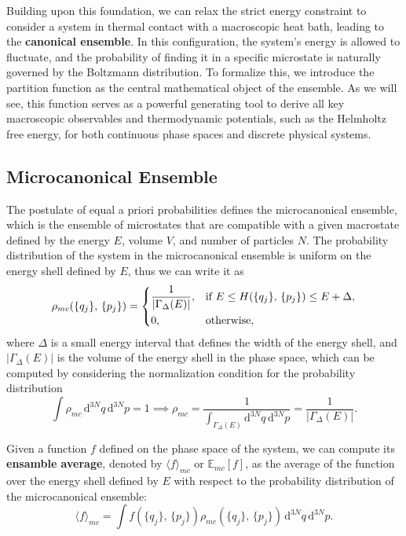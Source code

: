 Building upon this foundation, we can relax the strict energy constraint to consider a system in thermal contact with a macroscopic heat bath, leading to the \textbf{canonical ensemble}. In this configuration, the system's energy is allowed to fluctuate, and the probability of finding it in a specific microstate is naturally governed by the Boltzmann distribution. To formalize this, we introduce the partition function as the central mathematical object of the ensemble. As we will see, this function serves as a powerful generating tool to derive all key macroscopic observables and thermodynamic potentials, such as the Helmholtz free energy, for both continuous phase spaces and discrete physical systems.

\subsection{Microcanonical Ensemble}

The postulate of equal a priori probabilities defines the microcanonical ensemble, which is the ensemble of microstates that are compatible with a given macrostate defined by the energy \(E\), volume \(V\), and number of particles \(N\). The probability distribution of the system in the microcanonical ensemble is uniform on the energy shell defined by \(E\), thus we can write it as
\begin{equation}
    \rho_{mc}(\{q_j\},\,\{p_j\}) = \begin{dcases}
        \frac{1}{|\Gamma_{\Delta}(E)|}, & \text{if } E \leq H(\{q_j\},\,\{p_j\}) \leq E + \Delta, \\
        0,                              & \text{otherwise},
    \end{dcases}
    \label{eq:microcanonical_distribution}
\end{equation}
where \(\Delta\) is a small energy interval that defines the width of the energy shell, and \(|\Gamma_{\Delta}(E)|\) is the volume of the energy shell in the phase space, which can be computed by considering the normalization condition for the probability distribution
\[
    \int \rho_{mc} \, \mathrm{d}^{3N}q \, \mathrm{d}^{3N}p = 1 \implies \rho_{mc} = \frac{1}{\int_{\Gamma_{\Delta}(E)} \mathrm{d}^{3N}q \, \mathrm{d}^{3N}p} = \frac{1}{|\Gamma_{\Delta}(E)|}.
\]

Given a function \(f\) defined on the phase space of the system, we can compute its \textbf{ensamble average}, denoted by \(\langle f \rangle_{mc}\) or \(\mathbb{E}_{mc}\left[ f \right]\), as the average of the function over the energy shell defined by \(E\) with respect to the probability distribution of the microcanonical ensemble:
\begin{equation}
    \langle f \rangle_{mc} = \int f(\{q_j\},\,\{p_j\}) \rho_{mc}(\{q_j\},\,\{p_j\}) \, \mathrm{d}^{3N}q \, \mathrm{d}^{3N}p.
    \label{eq:microcanonical_ensemble_average}
\end{equation}


